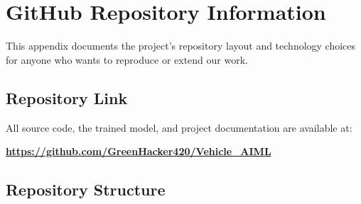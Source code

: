 \documentclass[conference]{IEEEtran}
\begin{document}
\appendix

\section{GitHub Repository Information}

This appendix documents the project's repository layout and technology choices for anyone who wants to reproduce or extend our work.

\subsection{Repository Link}
All source code, the trained model, and project documentation are available at:

\begin{center}
\textbf{\url{https://github.com/GreenHacker420/Vehicle_AIML}}
\end{center}

\subsection{Repository Structure}
\end{document}
